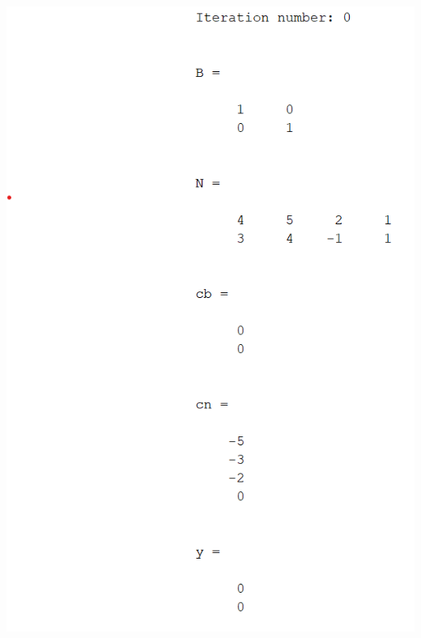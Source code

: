 \documentclass{article}
\begin{document}
\begin{itemize}
\begin{center}
        \includegraphics[scale = 0.7]{2_2_ii_iter0}

\end{center}
\end{itemize}
\end{document}
